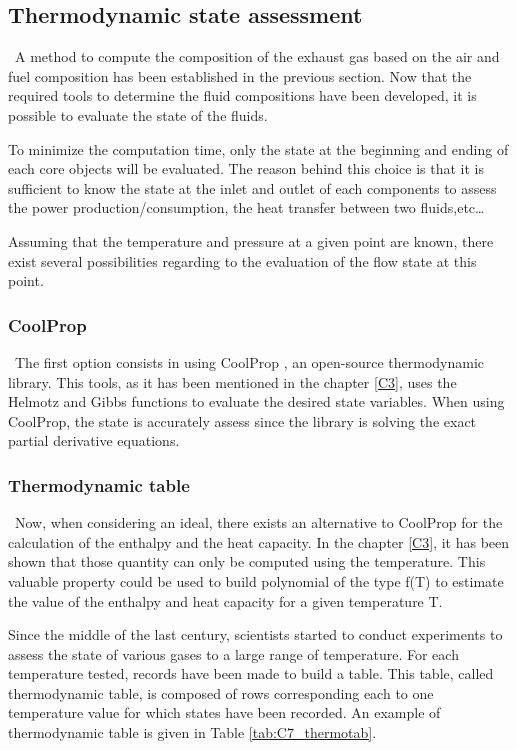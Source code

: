 \subsection{Thermodynamic state assessment}
\quad\ A method to compute the composition of the exhaust gas based on the air and fuel composition has been established in the previous section. Now that the required tools to determine the fluid compositions have been developed, it is possible to evaluate the state of the fluids. 

To minimize the computation time, only the state at the beginning and ending of each core objects will be evaluated. The reason behind this choice is that it is sufficient to know the state at the inlet and outlet of each components to assess the power production/consumption, the heat transfer between two fluids,etc\dots

Assuming that the temperature and pressure at a given point are known, there exist several possibilities regarding to the evaluation of the flow state at this point. 

\subsubsection{CoolProp}
\quad\ The first option consists in using CoolProp \cite{Bell2014}, an open-source thermodynamic library. This tools, as it has been mentioned in the chapter \ref{C3}, uses the Helmotz and Gibbs functions to evaluate the desired state variables. When using CoolProp, the state is accurately assess since the library is solving the exact partial derivative equations. 

\subsubsection{Thermodynamic table}
\quad\ Now, when considering an ideal, there exists an alternative to CoolProp for the calculation of the enthalpy and the heat capacity. In the chapter \ref{C3}, it has been shown that those quantity can only be computed using the temperature. This valuable property could be used to build polynomial of the type f(T) to estimate the value of the enthalpy and heat capacity for a given temperature T. 

Since the middle of the last century, scientists started to conduct experiments to assess the state of various gases to a large range of temperature. For each temperature tested, records have been made to build a table. This table, called thermodynamic table, is composed of rows corresponding each to one temperature value for which states have been recorded. 
An example of thermodynamic table is given in Table \ref{tab:C7_thermotab}.


